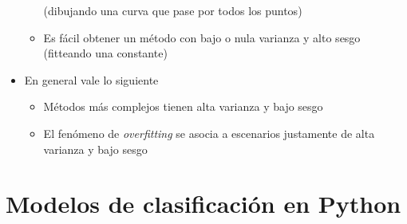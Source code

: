 \documentclass[leqno, 10pt, envcountsect]{beamer}
\numberwithin{equation}{section}
\theoremstyle{definition}
\theoremstyle{example}
\numberwithin{figure}{section}
\numberwithin{table}{section}
\let\olditem\item
\renewcommand{\item}{%
\olditem\vspace{1pt}}
\begin{document}
\begin{frame}
\begin{itemize}
\begin{itemize}
          (dibujando una curva que pase por todos los puntos)
        \item Es fácil obtener un método con bajo o nula varianza y alto sesgo
          (fitteando una constante)
      \end{itemize}
    \item En general vale lo siguiente
      \begin{itemize}
        \item Métodos más complejos tienen alta varianza y bajo sesgo
        \item El fenómeno de \textit{overfitting} se asocia a escenarios
          justamente de alta varianza y bajo sesgo
      \end{itemize}
  \end{itemize}
\end{frame}

\section{Modelos de clasificación en Python}
\label{sec:modelos_de_clasificacion_en_python}
\end{document}
